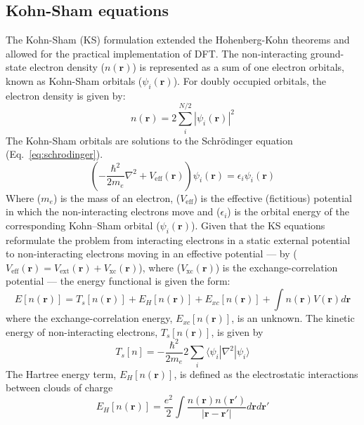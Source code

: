 \subsection{Kohn-Sham equations}
%
The Kohn-Sham (KS) formulation extended the Hohenberg-Kohn theorems and allowed for the practical implementation of DFT.\cite{kohnsham} The non-interacting ground-state electron density ($n(\mathbf{r})$) is represented as a sum of one electron orbitals, known as Kohn-Sham orbitals ($\psi_i(\mathbf{r})$). For doubly occupied orbitals, the electron density is given by:
%
\begin{equation}
n(\mathbf{r}) = 2 \sum_i^{N/2} |\psi_i(\mathbf{r})|^2
\end{equation}
%
The Kohn-Sham orbitals are solutions to the Schr\"odinger equation (Eq.~\ref{eq:schrodinger}). 
%
\begin{equation} \label{KSSchr\"odinger}
\left( - \frac{\hbar^2}{2m_e} \nabla^2 + V_{\mathrm{eff}}(\mathbf{r}) \right) \psi_i(\mathbf{r}) = \epsilon_i \psi_i(\mathbf{r})
\end{equation}
%
Where ($m_e$) is the mass of an electron, ($V_{\mathrm{eff}}$) is the effective (fictitious) potential in which the non-interacting electrons move and ($\epsilon_i$) is the orbital energy of the corresponding Kohn–Sham orbital ($\psi_i(\mathbf{r})$). Given that the KS equations reformulate the problem from interacting electrons in a static external potential to non-interacting electrons moving in an effective potential --- by ($V_{\mathrm{eff}}(\mathbf{r}) = V_{\mathrm{ext}}(\mathbf{r}) + V_{\mathrm{xc}}(\mathbf{r})$), where ($V_{\mathrm{xc}}(\mathbf{r})$) is the exchange-correlation potential --- the energy functional is given the form:
%
\begin{equation} \label{ksenergy}
E[n(\mathbf{r})] = T_s[n(\mathbf{r})] + E_H[n(\mathbf{r})] + E_{xc}[n(\mathbf{r})] + \int n(\mathbf{r})V(\mathbf{r}) d \mathbf{r}
\end{equation}
%
where the exchange-correlation energy, $E_{xc}[n(\mathbf{r})]$, is an unknown. The kinetic energy of non-interacting electrons, $T_s[n(\mathbf{r})]$, is given by
\begin{equation} \label{kinetic}
T_s [n]= -\frac{\hbar^2}{2m_e} 2 \sum_i \langle \psi_i|\nabla^2|\psi_i\rangle 
\end{equation}
%
The Hartree energy term, $E_H[n(\mathbf{r})]$, is defined as the electrostatic interactions between clouds of charge
%
\begin{equation}
E_H[n(\mathbf{r})] = \frac{e^2}{2} \int \frac{n(\mathbf{r})n(\mathbf{r'})}{|\mathbf{r - r'}|}d \mathbf{r}d \mathbf{r'}
\end{equation}

